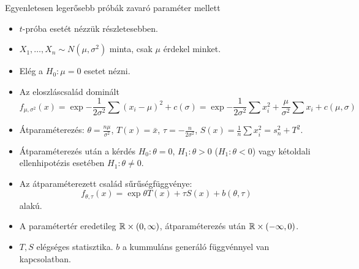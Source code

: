 \documentclass[aspectratio=169,notheorems,9pt,\option]{beamer}
\begin{document}
\begin{frame}{Egyenletesen legerősebb próbák zavaró paraméter mellett}
  \begin{itemize}
    \item $t$-próba esetét nézzük részletesebben.
    \item $X_1,\dots,X_n\sim N (\mu,\sigma^2)$ minta, csak $\mu$ érdekel
    minket. 
    \item Elég a $H_0:\mu=0$ esetet nézni.
    \item Az eloszláscsalád dominált
    \begin{displaymath}
      f_{\mu,\sigma^2} (x)=\exp{-\frac1{2\sigma^2}\sum(x_i-\mu)^2 + c
      (\sigma)}=
      \exp{-\frac{1}{2\sigma^2}\sum x_i^2+\frac\mu{\sigma^2}\sum x_i+c (\mu,\sigma)}
    \end{displaymath}
    \item Átparaméterezés: $\theta=\frac{n\mu}{\sigma^2}$, 
    $T(x)=\bar{x}$, $\tau=-\frac{n}{2\sigma^2}$, 
    $S (x)=\frac1n\sum x_i^2=s_n^2+T^2$.
    \item Átparaméterezés után a kérdés $H_0:\theta=0$, $H_1:\theta>0$
    ($H_1:\theta<0$) vagy kétoldali ellenhipotézis esetében $H_1:\theta\neq0$.
    \item Az átparaméterezett család sűrűségfüggvénye:
    \begin{displaymath}
      f_{\theta,\tau} (x) =\exp{\theta T (x)+\tau S (x)+b (\theta,\tau)}
    \end{displaymath}
    alakú. 
    \item A paramétertér eredetileg $\mathbb{R}\times (0,\infty)$,
    átparaméterezés után $\mathbb{R}\times (-\infty,0)$.
    \item $T,S$ elégséges statisztika. $b$ a kummuláns generáló
    függvénnyel van kapcsolatban.
  \end{itemize}
\end{frame}
\end{document}
